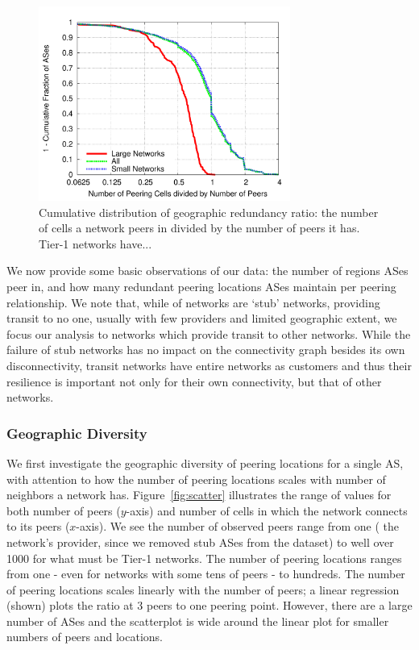 \begin{figure}[tb]
\centering
\includegraphics[width=3.25in]{ratio}
\caption[]{\label{fig:ratio} Cumulative distribution of geographic redundancy ratio: the number of cells a network peers in divided by the number of peers it has. Tier-1 networks have... } 
\end{figure}




 


    We now provide some basic observations of our data: the number of regions ASes peer in, and how many redundant peering locations ASes maintain per peering relationship.
    We note that, while  of networks are `stub' networks, providing transit to no one, usually with few providers and limited geographic extent, we focus our analysis to networks which provide transit to other networks.
    While the failure of stub networks has no impact on the connectivity graph besides its own disconnectivity, transit networks have entire networks as customers and thus their resilience is important not only for their own connectivity, but that of other networks.

\subsubsection*{Geographic Diversity}
    We first investigate the geographic diversity of peering locations for a single AS, with attention to how the number of peering locations scales with number of neighbors a network has.
    Figure~\ref{fig:scatter} illustrates the range of values for both number of peers ($y$-axis) and number of cells in which the network connects to its peers ($x$-axis).
    We see the number of observed peers range from one (\ie{} the network's provider, since we removed stub ASes from the dataset) to well over 1000 for what must be Tier-1 networks.
    The number of peering locations ranges from one - even for networks with some tens of peers - to hundreds.
    The number of peering locations scales linearly with the number of peers; a linear regression (shown) plots the ratio  at 3 peers to one peering point. 
    However, there are a large number of ASes and the scatterplot is wide around the linear plot for smaller numbers of peers and locations.



